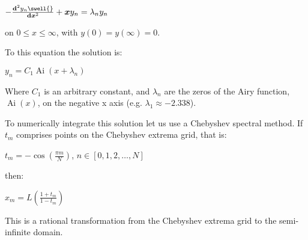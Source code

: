 \documentclass{article}
\newcommand{\tmmathbf}[1]{\ensuremath{\boldsymbol{#1}}}
\newcommand{\tmop}[1]{\ensuremath{\operatorname{#1}}}
\newcommand{\tmtextmd}[1]{{\mdseries{#1}}}
\begin{document}
$- \frac{\mathbf{d}^2 y_n \swell{}}{\mathit{\mathbf{d}}
\text{\tmtextmd{\ensuremath{\tmmathbf{x}}}}^2} +\tmmathbf{x}y_n = \lambda_n
y_n$

on $0 \leqslant x \leqslant \infty$, with $y (0) = y (\infty) = 0$.

To this equation the solution is:

$y_n = C_1 \tmop{Ai} (x + \lambda_n)$

Where $C_1$ is an arbitrary constant, and $\lambda_n$ are the zeros of the
Airy function, $\tmop{Ai} (x)$, on the negative x axis (e.g. $\lambda_1
\approx - 2.338$).

To numerically integrate this solution let us use a Chebyshev spectral
method. If $t_m$ comprises points on the Chebyshev extrema grid, that is:

$t_m = - \cos \left( \frac{\pi m}{N} \right)$, \qquad$n \in [0, 1, 2, \ldots,
N]$

then:

$x_m = L \left( \frac{1 + t_m}{1 - t_m} \right)$

This is a rational transformation from the Chebyshev extrema grid to the
semi-infinite domain.
\end{document}

